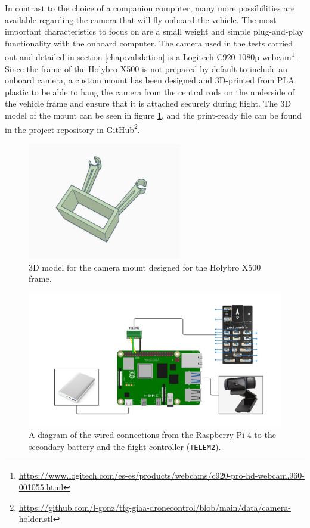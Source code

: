 In contrast to the choice of a companion computer, many more possibilities are available regarding the camera that will fly onboard the vehicle.
The most important characteristics to focus on are a small weight and simple plug-and-play functionality with the onboard computer.
The camera used in the tests carried out and detailed in section \ref{chap:validation} is a Logitech C920 1080p webcam\footnote{\url{https://www.logitech.com/es-es/products/webcams/c920-pro-hd-webcam.960-001055.html}}.
Since the frame of the Holybro X500 is not prepared by default to include an onboard camera, a custom mount has been designed and 3D-printed from PLA plastic to be able to hang the camera from the central rods on the underside of the vehicle frame and ensure that it is attached securely during flight.
The 3D model of the mount can be seen in figure \ref{fig:camera-holder-3d}, and the print-ready file can be found in the project repository in GitHub\footnote{\url{https://github.com/l-gonz/tfg-giaa-dronecontrol/blob/main/data/camera-holder.stl}}.

\begin{figure}
  \centering
  \includegraphics[width=0.6\textwidth, keepaspectratio]{img/cam-holder.jpg}
  \caption{3D model for the camera mount designed for the Holybro X500 frame.}
  \label{fig:camera-holder-3d}
\end{figure}


\begin{figure}
  \centering
  \includegraphics[width=\textwidth,keepaspectratio]{img/wiring-diagram.jpg}
  \caption{A diagram of the wired connections from the Raspberry Pi 4 to the secondary battery and the flight controller (\texttt{TELEM2}).}
  \label{fig:wiring}
\end{figure}


